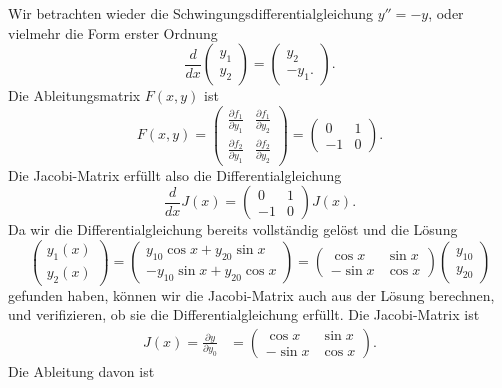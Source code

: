 \begin{beispiel}
Wir betrachten wieder die Schwingungsdifferentialgleichung $y''=-y$,
oder vielmehr die Form erster Ordnung
\[
\frac{d}{dx}\begin{pmatrix}y_1\\y_2\end{pmatrix}
=
\begin{pmatrix}
y_2\\-y_1.
\end{pmatrix}.
\]
Die Ableitungsmatrix $F(x,y)$ ist
\[
F(x,y)
=
\begin{pmatrix}
\displaystyle\frac{\partial f_1}{\partial y_1}&\displaystyle\frac{\partial f_1}{\partial y_2}\\
\displaystyle\frac{\partial f_2}{\partial y_1}&\displaystyle\frac{\partial f_2}{\partial y_2}
\end{pmatrix}
=
\begin{pmatrix}
 0&1\\
-1&0
\end{pmatrix}.
\]
Die Jacobi-Matrix erfüllt also die Differentialgleichung
\[
\frac{d}{dx}J(x)=\begin{pmatrix}0&1\\-1&0\end{pmatrix}J(x).
\]
Da wir die Differentialgleichung bereits vollständig gelöst und
die Lösung
\[
\begin{pmatrix}
y_1(x)\\y_2(x)
\end{pmatrix}
=
\begin{pmatrix}
 y_{10}\cos x+y_{20}\sin x\\
-y_{10}\sin x+y_{20}\cos x
\end{pmatrix}
=
\begin{pmatrix}
 \cos x&\sin x\\
-\sin x&\cos x
\end{pmatrix}
\begin{pmatrix}y_{10}\\y_{20}\end{pmatrix}
\]
gefunden haben, können wir die Jacobi-Matrix auch aus der Lösung berechnen,
und verifizieren, ob sie die Differentialgleichung erfüllt.
Die Jacobi-Matrix ist
\begin{align*}
J(x)
=
\frac{\partial y}{\partial y_0}
&=
\begin{pmatrix}
 \cos x&\sin x\\
-\sin x&\cos x
\end{pmatrix}.
\end{align*}
Die Ableitung davon ist

\end{beispiel}

